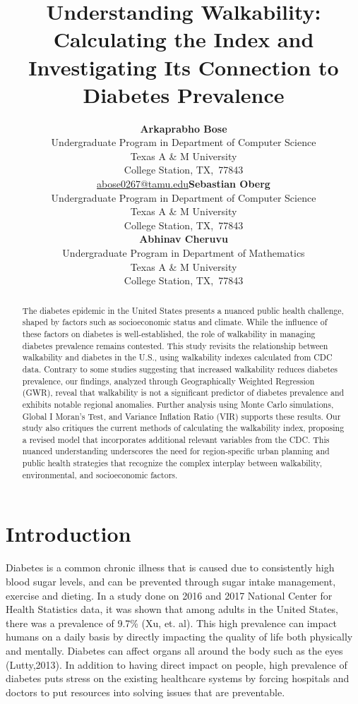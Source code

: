 \documentclass[
]{article}
\title{Understanding Walkability: Calculating the Index and
Investigating Its Connection to Diabetes Prevalence}
\author{\textbf{Arkaprabho Bose}\\Undergraduate Program in Department of
Computer Science\\Texas A \& M University\\College Station,
TX,\ 77843\\\href{mailto:abose0267@tamu.edu}{abose0267@tamu.edu}\asep\textbf{Sebastian
Oberg}\\Undergraduate Program in Department of Computer Science\\Texas A
\& M University\\College Station, TX,\ 77843\\\asep\textbf{Abhinav
Cheruvu}\\Undergraduate Program in Department of Mathematics\\Texas A \&
M University\\College Station, TX,\ 77843\\}
\date{}
\begin{document}
\maketitle
\begin{abstract}
The diabetes epidemic in the United States presents a nuanced public
health challenge, shaped by factors such as socioeconomic status and
climate. While the influence of these factors on diabetes is
well-established, the role of walkability in managing diabetes
prevalence remains contested. This study revisits the relationship
between walkability and diabetes in the U.S., using walkability indexes
calculated from CDC data. Contrary to some studies suggesting that
increased walkability reduces diabetes prevalence, our findings,
analyzed through Geographically Weighted Regression (GWR), reveal that
walkability is not a significant predictor of diabetes prevalence and
exhibits notable regional anomalies. Further analysis using Monte Carlo
simulations, Global I Moran's Test, and Variance Inflation Ratio (VIR)
supports these results. Our study also critiques the current methods of
calculating the walkability index, proposing a revised model that
incorporates additional relevant variables from the CDC. This nuanced
understanding underscores the need for region-specific urban planning
and public health strategies that recognize the complex interplay
between walkability, environmental, and socioeconomic factors.
\end{abstract}

\section{Introduction}\label{sec-intro}

Diabetes is a common chronic illness that is caused due to consistently
high blood sugar levels, and can be prevented through sugar intake
management, exercise and dieting. In a study done on 2016 and 2017
National Center for Health Statistics data, it was shown that among
adults in the United States, there was a prevalence of 9.7\% (Xu, et.
al). This high prevalence can impact humans on a daily basis by directly
impacting the quality of life both physically and mentally. Diabetes can
affect organs all around the body such as the eyes (Lutty,2013). In
addition to having direct impact on people, high prevalence of diabetes
puts stress on the existing healthcare systems by forcing hospitals and
doctors to put resources into solving issues that are preventable.
\end{document}
